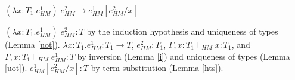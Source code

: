 \begin{case}
$(\lambda x:T_{1}.e_{HM}^{1})\;e_{HM}^{2}\rightarrow e_{HM}^{1}[e_{HM}^{2}/x]$

$(\lambda x:T_{1}.e_{HM}^{1})\;e_{HM}^{2}:T$ by the induction hypothesis and uniqueness of types (Lemma \ref{uot}).  $\lambda x:T_{1}.e_{HM}^{1}:T_{1}\rightarrow T$, $e_{HM}^{2}:T_{1}$, $\Gamma,x:T_{1}\vdash_{HM}x:T_{1}$, and $\Gamma,x:T_{1}\vdash_{HM}e_{HM}^{1}:T$ by inversion (Lemma \ref{i}) and uniqueness of types (Lemma \ref{uot}).  $e_{HM}^{1}[e_{HM}^{2}/x]:T$ by term substitution (Lemma \ref{hts}).
\end{case}